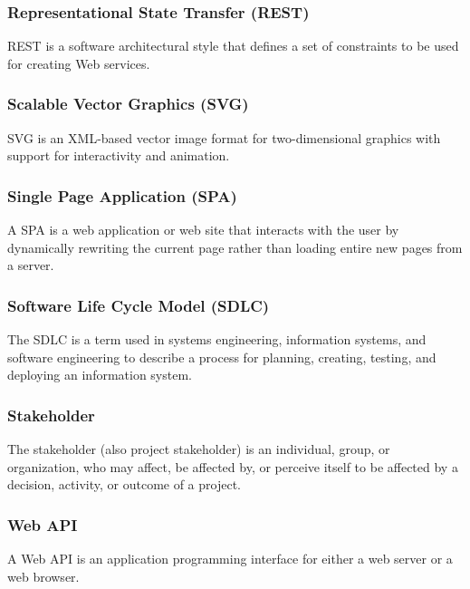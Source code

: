 \subsubsection*{Representational State Transfer (REST)}
REST is a software architectural style that defines a set of constraints to be used for creating Web services.

\subsubsection*{Scalable Vector Graphics (SVG)}
SVG is an XML-based vector image format for two-dimensional graphics with support for interactivity and animation.

\subsubsection*{Single Page Application (SPA)}
A SPA is a web application or web site that interacts with the user by dynamically rewriting the current page rather than loading entire new pages from a server.

\subsubsection*{Software Life Cycle Model (SDLC)}
The SDLC is a term used in systems engineering, information systems, and software engineering to describe a process for planning, creating, testing, and deploying an information system.

\subsubsection*{Stakeholder}
The stakeholder (also project stakeholder) is an individual, group, or organization, who may affect, be affected by, or perceive itself to be affected by a decision, activity, or outcome of a project.

\subsubsection*{Web API}
A Web API is an application programming interface for either a web server or a web browser.
